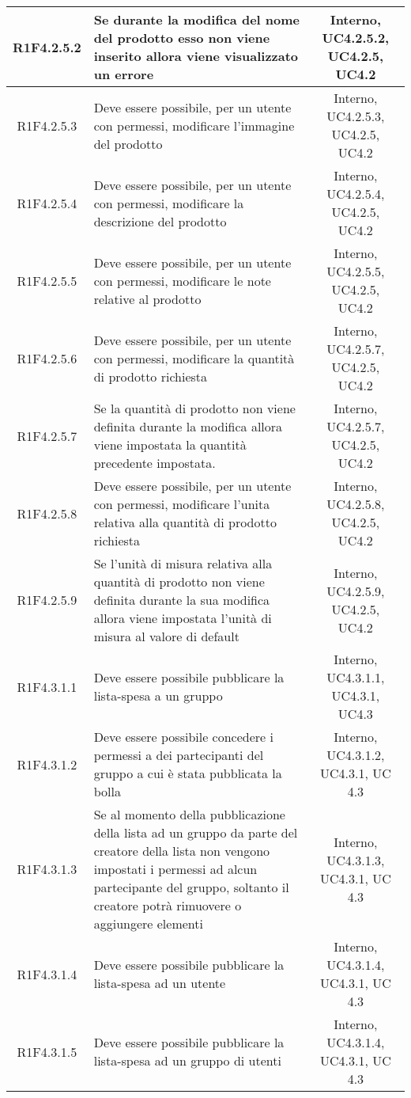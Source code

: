 \begin{longtable}{|c|>{\centering}m{7cm}|c|}
			\hline
			R1F4.2.5.2 & Se durante la modifica del nome del prodotto esso non viene inserito allora viene visualizzato un errore & Interno, UC4.2.5.2, UC4.2.5, UC4.2 \\
			\hline
			R1F4.2.5.3 & Deve essere possibile, per un utente con permessi, modificare l'immagine del prodotto & Interno, UC4.2.5.3, UC4.2.5, UC4.2 \\
			\hline
			R1F4.2.5.4 & Deve essere possibile, per un utente con permessi, modificare la descrizione del prodotto & Interno, UC4.2.5.4, UC4.2.5, UC4.2 \\
			\hline
			R1F4.2.5.5 & Deve essere possibile, per un utente con permessi, modificare le note relative al prodotto & Interno, UC4.2.5.5, UC4.2.5, UC4.2 \\
			\hline
			R1F4.2.5.6 & Deve essere possibile, per un utente con permessi, modificare la quantità di prodotto richiesta & Interno, UC4.2.5.7, UC4.2.5, UC4.2 \\
			\hline
			R1F4.2.5.7 & Se la quantità di prodotto non viene definita durante la modifica allora viene impostata la quantità precedente impostata. & Interno, UC4.2.5.7, UC4.2.5, UC4.2 \\
			\hline
			R1F4.2.5.8 & Deve essere possibile, per un utente con permessi, modificare l'unita relativa alla quantità di prodotto richiesta & Interno, UC4.2.5.8, UC4.2.5, UC4.2 \\
			\hline
			R1F4.2.5.9 & Se l'unità di misura relativa alla quantità di prodotto non viene definita durante la sua modifica allora viene impostata l'unità di misura al valore di default & Interno, UC4.2.5.9, UC4.2.5, UC4.2 \\
			\hline
			R1F4.3.1.1 & Deve essere possibile pubblicare la lista-spesa a un gruppo & Interno, UC4.3.1.1, UC4.3.1, UC4.3 \\
			\hline
			R1F4.3.1.2 & Deve essere possibile concedere i permessi a dei partecipanti del gruppo a cui è stata pubblicata la bolla & Interno, UC4.3.1.2, UC4.3.1, UC 4.3 \\
			\hline
			R1F4.3.1.3 & Se al momento della pubblicazione della lista ad un gruppo da parte del creatore della lista non vengono impostati i permessi ad alcun partecipante del gruppo, soltanto il creatore potrà rimuovere o aggiungere elementi & Interno, UC4.3.1.3, UC4.3.1, UC 4.3 \\
			\hline
			R1F4.3.1.4 & Deve essere possibile pubblicare la lista-spesa ad un utente & Interno, UC4.3.1.4, UC4.3.1, UC 4.3 \\
			\hline
			R1F4.3.1.5 & Deve essere possibile pubblicare la lista-spesa ad un gruppo di utenti & Interno, UC4.3.1.4, UC4.3.1, UC 4.3 \\

\end{longtable}
